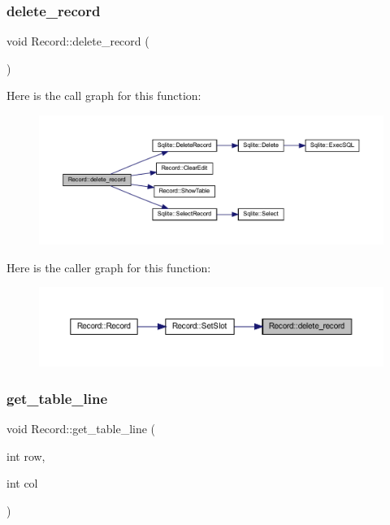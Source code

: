 \subsubsection{\texorpdfstring{delete\_record}{delete\_record}}
{\footnotesize\ttfamily void Record\+::delete\+\_\+record (\begin{DoxyParamCaption}{ }\end{DoxyParamCaption})\hspace{0.3cm}{\ttfamily [slot]}}

Here is the call graph for this function\+:
\nopagebreak
\begin{figure}[H]
\begin{center}
\leavevmode
\includegraphics[width=350pt]{class_record_a4c0e51ba399bdec6c9630b193914e7fb_cgraph}
\end{center}
\end{figure}
Here is the caller graph for this function\+:
\nopagebreak
\begin{figure}[H]
\begin{center}
\leavevmode
\includegraphics[width=350pt]{class_record_a4c0e51ba399bdec6c9630b193914e7fb_icgraph}
\end{center}
\end{figure}
\mbox{\label{class_record_a89ae432465b31de8a27e2fe8e929b62a}} 
\subsubsection{\texorpdfstring{get\_table\_line}{get\_table\_line}}
{\footnotesize\ttfamily void Record\+::get\+\_\+table\+\_\+line (\begin{DoxyParamCaption}\item[{int}]{row,  }\item[{int}]{col }\end{DoxyParamCaption})\hspace{0.3cm}{\ttfamily [slot]}}

